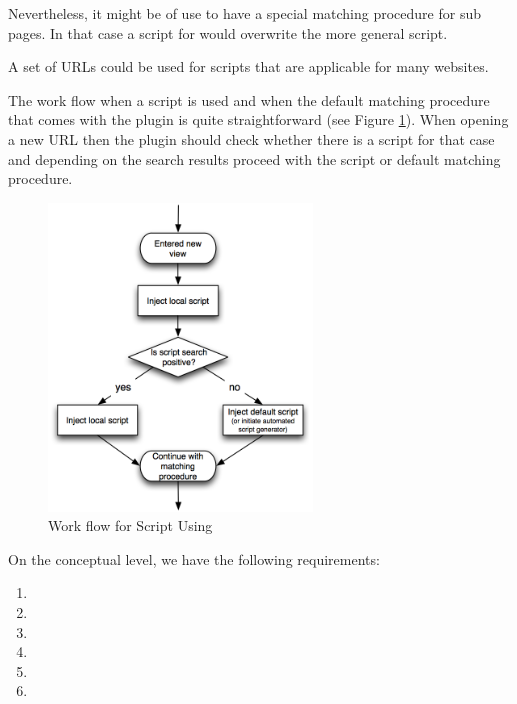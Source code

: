 Nevertheless, it might be of use to have a special matching procedure for sub pages.  In that case a script for  would overwrite the more general script. 

A set of URLs could be used for scripts that are applicable for many websites. 

The work flow when a script is used and when the default matching procedure that comes with the plugin is quite straightforward (see Figure \ref{script-usage-basic}). When opening a new URL then the plugin should check whether there is a script for that case and depending on the search results proceed with the script or default matching procedure.

\begin{figure}\centering
		\includegraphics[width=7cm]{images/script-usage-basic.png}
		\caption{Work flow for Script Using}
		\label{script-usage-basic}
\end{figure} 

On the conceptual level, we have the following requirements:

\begin{enumerate}
\item \reqSi
\item \reqSii
\item \reqSiii
\item \reqSiv
\item \reqSv
\item \reqSvi
\end{enumerate}

